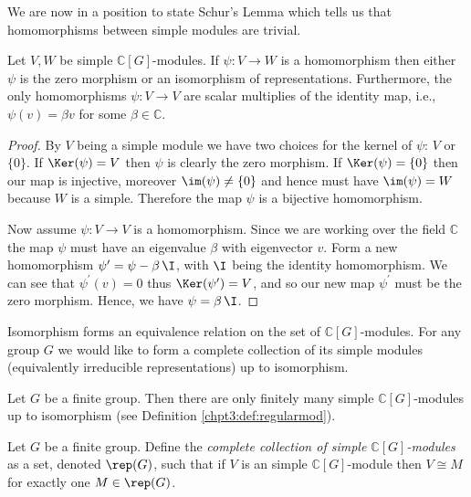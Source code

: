 \documentclass[11pt]{report}
\begin{document}
We are now in a position to state Schur's 
Lemma which tells us that homomorphisms between simple modules are trivial. 


\begin{lemma}
	\label{chpt3:lem:schur}
	Let $V,W$ be simple $\mathbb{C}[G]$-modules. If $\psi:V
	\to W$ is a  homomorphism then either $\psi$ is the zero morphism or an 
	isomorphism of representations. 	Furthermore, the only homomorphisms $\psi:V 
	\to V$ are scalar multiplies of the identity map, i.e., $\psi(v) =  \beta v$ for some $\beta \in \mathbb{C}$.
\end{lemma}

\begin{proof}
	By $V$ being a simple module we have two choices for the 
	kernel of $\psi$: $V$ or $\{0\}$. If $\Ker(\psi)= V$ then $\psi$ is clearly the 
	zero morphism. If $\Ker(\psi) = \{0\}$ then our map is injective, moreover 
	$\im(\psi) \neq \{0\}$ and hence must have 
	$\im(\psi) = W$ because $W$ is a simple. Therefore the map $\psi$ is a bijective homomorphism.
	
	Now assume $\psi:V\to V$ is a homomorphism. Since we are working over the field $\mathbb{C}$ the map $\psi$ must 
	have an eigenvalue $\beta$ with eigenvector $v$. Form a new homomorphism 
	$\psi^{\prime} = \psi - \beta \,\I$, with $\I$ being the identity homomorphism. We can see that $\psi^{\prime}(v) = 0$ 
	thus $\Ker(\psi^{\prime}) = V$, and so our new map $\psi^{\prime}$ must be the zero morphism. Hence, we have $\psi = \beta \, \I$.
\end{proof}








Isomorphism forms an equivalence relation on the set of $\mathbb{C}[G]$-modules. For any group $G$ we would like to form a complete collection of its simple modules (equivalently irreducible representations) up to isomorphism. 

\begin{lemma}
	Let $G$ be a finite group. Then there are only finitely many simple $\mathbb{C}[G]$-modules up to isomorphism (see Definition \ref{chpt3:def:regularmod}).
\end{lemma}
\begin{defn}
	
	Let $G$ be a finite group.	Define the \emph{complete collection of simple $\mathbb{C}[G]$-modules} as a set, denoted $\rep(G)$, such that if $V$ is an simple $\mathbb{C}[G]$-module then $V \cong M$ for exactly one $M \in \rep(G)$.
	
\end{defn}
\end{document}
